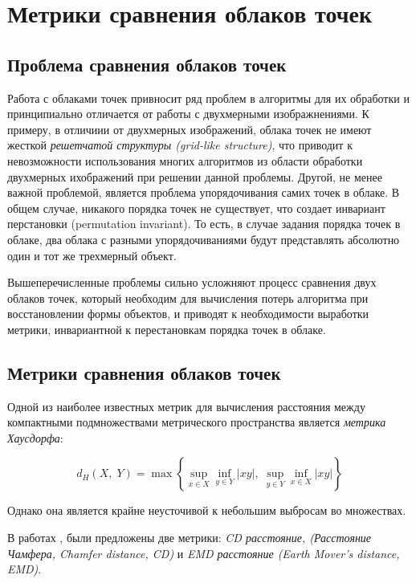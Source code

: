 \section{Метрики сравнения облаков точек} \label{section:metrics-comparation}

\subsection{Проблема сравнения облаков точек}

Работа с облаками точек привносит ряд проблем в алгоритмы для их обработки и принципиально отличается от работы с двухмерными изображнениями. К примеру, в отличиии от двухмерных изображений, облака точек не имеют жесткой \textit{решетчатой структуры (grid-like structure)}, что приводит к невозможности использования многих алгоритмов из области обработки двухмерных ихображений при решении данной проблемы. Другой, не менее важной проблемой, является проблема упорядочивания самих точек в облаке. В общем случае, никакого порядка точек не существует, что создает инвариант перстановки (permutation invariant). То есть, в случае задания порядка точек в облаке, два облака с разными упорядочиваниями будут представлять абсолютно один и тот же трехмерный объект.

Вышеперечисленные проблемы сильно усложняют процесс сравнения двух облаков точек, который необходим для вычисления потерь алгоритма при восстановлении формы объектов, и приводят к необходимости выработки метрики, инвариантной к перестановкам порядка точек в облаке.


\subsection{Метрики сравнения облаков точек}

Одной из наиболее известных метрик для вычисления расстояния между компактными подмножествами метрического пространства является \textit{метрика Хаусдорфа}:

\[
	d_{H}(X,\;Y)=\max \left\{\sup\limits_{{x\in X}}\inf\limits_{{y\in Y}}|xy|,\;\sup\limits_{{y\in Y}}\inf\limits_{{x\in X}}|xy|\right\}
\]

Однако она является крайне неусточивой к небольшим выбросам во множествах.


В работах \cite{metrics-source}, \cite{lrgm-cloud} были предложены две метрики: \textit{CD расстояние, (Расстояние Чамфера, Chamfer distance, CD)} и \textit{EMD расстояние (Earth Mover’s distance, EMD)}.

